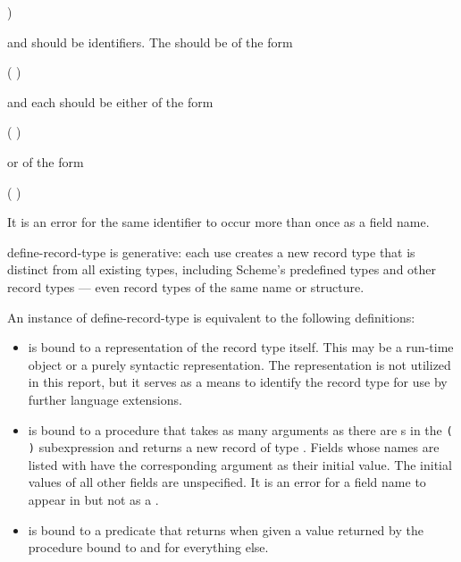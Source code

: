 \begin{entry}{%
)}

\syntax
{} and  should be identifiers.
The  should be of the form
\begin{scheme}
(  \dotsfoo)%
\end{scheme}
and each  should be either of the form
\begin{scheme}
( )%
\end{scheme}
or of the form
\begin{scheme}
(  )%
\end{scheme}

It is an error for the same identifier to occur more than once as a
field name.

{\cf define-record-type} is generative: each use creates a new record
type that is distinct from all existing types, including Scheme's
predefined types and other record types --- even record types of
the same name or structure.

An instance of {\cf define-record-type} is equivalent to the following
definitions:

\begin{itemize}

\item {} is bound to a representation of the record type itself.
This may be a run-time object or a purely syntactic representation.
The representation is not utilized in this report, but it serves as a
means to identify the record type for use by further language extensions.

\item {} is bound to a procedure that takes as
  many arguments as there are s in the
  \texttt{( \dotsfoo)} subexpression and returns a
  new record of type .  Fields whose names are listed with
   have the corresponding argument as their
  initial value.  The initial values of all other fields are
  unspecified.  It is an error for a field name to appear in
   but not as a .

\item {} is bound to a predicate that returns \schtrue{} when given a
  value returned by the procedure bound to   and \schfalse{} for
  everything else.


\end{itemize}
\end{entry}

